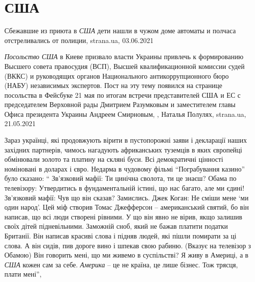  
 
 
 
 
\chapter{США}

Сбежавшие из приюта в \emph{США} дети нашли в чужом доме автоматы и полчаса отстреливались от полиции,
strana.ua, 03.06.2021

\emph{Посольство США} в Киеве призвало власти Украины привлечь к формированию
Высшего совета правосудия (ВСП), Высшей квалификационной комиссии судей (ВККС)
и руководящих органов Национального антикоррупционного бюро (НАБУ) независимых
экспертов.  Пост на эту тему появился на странице посольства в Фейсбуке 21 мая
по итогам встречи представителей США и ЕС с председателем Верховной рады
Дмитрием Разумковым и заместителем главы Офиса президента Украины Андреем
Смирновым,
, Наталья Полулях, strana.ua, 21.05.2021

Зараз українці, які продовжують вірити в пустопорожні заяви і декларації наших
західних партнерів, чимось нагадують африканських туземців в яких європейці
обмінювали золото та платину на скляні буси. Всі демократичні цінності
номіновані в доларах і євро. Недарма в чудовому фільмі \enquote{Пограбування казино}
було сказано: \enquote{ Зв'язковий мафії: Ти цинічна сволота, ти це знаєш? Обама по
телевізору: Утвердитись в фундаментальній істині, що нас багато, але ми єдині!
Зв'язковий мафії: Чув що він сказав? Замислись. Джек Коган: Не сміши мене \enquote{ми
один народ}. Цей міф створив Томас Джефферсон – американський святий, бо він
написав, що всі люди створені рівними. У що він явно не вірив, якщо залишив
своїх дітей підневільними. Заможній сноб, який не бажав платити податки
Британії. Він написав красиві слова і підняв людей, які пішли помирати за ці
слова. А він сидів, пив дороге вино і шпекав свою рабиню. (Вказує на телевізор
з Обамою) Він говорить мені, що ми живемо в суспільстві? Я живу в Америці, а в
\emph{США} кожен сам за себе. \emph{Америка} – це не країна, це лише бізнес. Тож трясця,
плати мені}, 
